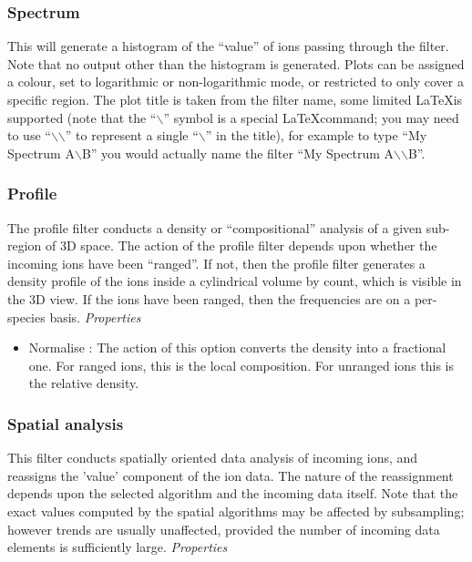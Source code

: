 \documentclass[10pt]{article}
\begin{document}
{\begin{itemize}
\end{itemize}
\subsubsection{Spectrum}
 This will generate a histogram of the ``value'' of ions passing through the filter. Note that no output other than the histogram is generated. Plots can be assigned a colour, set to logarithmic or non-logarithmic mode, or restricted to only cover a specific region. The plot title is taken from the filter name, some limited \LaTeX is supported (note that the ``$\backslash$'' symbol is a special \LaTeX command; you may need to use ``$\backslash$$\backslash$'' to represent a single ``$\backslash$'' in the title), for example to type ``My Spectrum A$\backslash$B'' you would actually name the filter ``My Spectrum A$\backslash$$\backslash$B''.
 
\subsubsection{Profile}
 
The profile filter conducts a density or ``compositional'' analysis of a given sub-region of 3D space. The action of the profile filter depends upon whether the incoming ions have been ``ranged''. If not, then the profile filter generates a density profile of the ions inside a cylindrical volume by count, which is visible in the 3D view. If the ions have been ranged, then the frequencies are on a per-species basis. \emph{Properties}
\begin{itemize}
\item  Normalise : The action of this option converts the density into a fractional one. For ranged ions, this is the local composition. For unranged ions this is the relative density.

\end{itemize}
\subsubsection{Spatial analysis}
 
 
 This filter conducts spatially oriented data analysis of incoming ions, and reassigns the 'value' component of the ion data. The nature of the reassignment depends upon the selected algorithm and the incoming data itself. Note that the exact values computed by the spatial algorithms may be affected by subsampling; however trends are usually unaffected, provided the number of incoming data elements is sufficiently large. \emph{ Properties}
\begin{itemize}
 

\end{itemize}}
\end{document}
